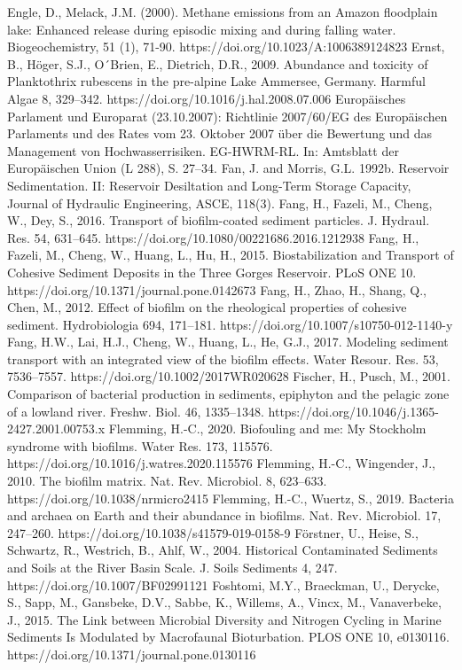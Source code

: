 \begin{thebibliography}{}
Engle, D., Melack, J.M. (2000). Methane emissions from an Amazon floodplain lake: Enhanced release during episodic mixing and during falling water. Biogeochemistry, 51 (1), 71-90. https://doi.org/10.1023/A:1006389124823
Ernst, B., Höger, S.J., O´Brien, E., Dietrich, D.R., 2009. Abundance and toxicity of Planktothrix rubescens in the pre-alpine Lake Ammersee, Germany. Harmful Algae 8, 329–342. https://doi.org/10.1016/j.hal.2008.07.006
Europäisches Parlament und Europarat (23.10.2007): Richtlinie 2007/60/EG des Europäischen Parlaments und des Rates vom 23. Oktober 2007 über die Bewertung und das Management von Hochwasserrisiken. EG-HWRM-RL. In: Amtsblatt der Europäischen Union (L 288), S. 27–34.
Fan, J. and Morris, G.L. 1992b. Reservoir Sedimentation. II: Reservoir Desiltation and Long-Term Storage Capacity, Journal of Hydraulic Engineering, ASCE, 118(3).
Fang, H., Fazeli, M., Cheng, W., Dey, S., 2016. Transport of biofilm-coated sediment particles. J. Hydraul. Res. 54, 631–645. https://doi.org/10.1080/00221686.2016.1212938
Fang, H., Fazeli, M., Cheng, W., Huang, L., Hu, H., 2015. Biostabilization and Transport of Cohesive Sediment Deposits in the Three Gorges Reservoir. PLoS ONE 10. https://doi.org/10.1371/journal.pone.0142673
Fang, H., Zhao, H., Shang, Q., Chen, M., 2012. Effect of biofilm on the rheological properties of cohesive sediment. Hydrobiologia 694, 171–181. https://doi.org/10.1007/s10750-012-1140-y
Fang, H.W., Lai, H.J., Cheng, W., Huang, L., He, G.J., 2017. Modeling sediment transport with an integrated view of the biofilm effects. Water Resour. Res. 53, 7536–7557. https://doi.org/10.1002/2017WR020628
Fischer, H., Pusch, M., 2001. Comparison of bacterial production in sediments, epiphyton and the pelagic zone of a lowland river. Freshw. Biol. 46, 1335–1348. https://doi.org/10.1046/j.1365-2427.2001.00753.x
Flemming, H.-C., 2020. Biofouling and me: My Stockholm syndrome with biofilms. Water Res. 173, 115576. https://doi.org/10.1016/j.watres.2020.115576
Flemming, H.-C., Wingender, J., 2010. The biofilm matrix. Nat. Rev. Microbiol. 8, 623–633. https://doi.org/10.1038/nrmicro2415
Flemming, H.-C., Wuertz, S., 2019. Bacteria and archaea on Earth and their abundance in biofilms. Nat. Rev. Microbiol. 17, 247–260. https://doi.org/10.1038/s41579-019-0158-9
Förstner, U., Heise, S., Schwartz, R., Westrich, B., Ahlf, W., 2004. Historical Contaminated Sediments and Soils at the River Basin Scale. J. Soils Sediments 4, 247. https://doi.org/10.1007/BF02991121
Foshtomi, M.Y., Braeckman, U., Derycke, S., Sapp, M., Gansbeke, D.V., Sabbe, K., Willems, A., Vincx, M., Vanaverbeke, J., 2015. The Link between Microbial Diversity and Nitrogen Cycling in Marine Sediments Is Modulated by Macrofaunal Bioturbation. PLOS ONE 10, e0130116. https://doi.org/10.1371/journal.pone.0130116

\end{thebibliography}

